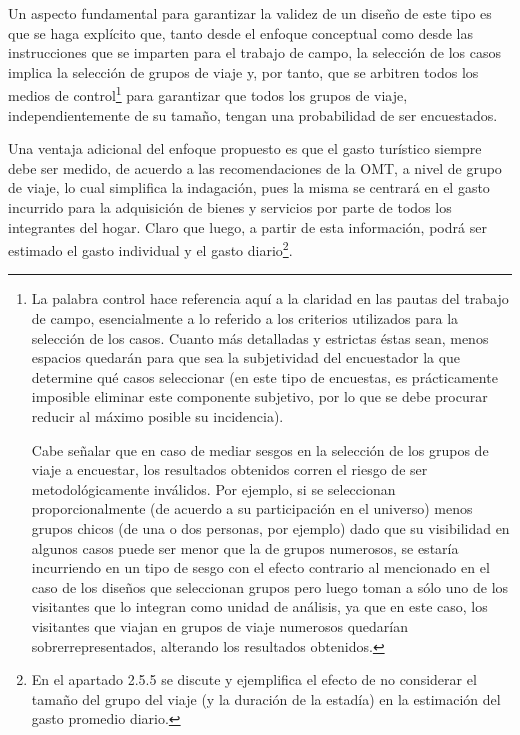 \documentclass[
]{book}
\begin{document}
Un aspecto fundamental para garantizar la validez de un diseño de este tipo es que se haga explícito que, tanto desde el enfoque conceptual como desde las instrucciones que se imparten para el trabajo de campo, la selección de los casos implica la selección de grupos de viaje y, por tanto, que se arbitren todos los medios de control\footnote{La palabra control hace referencia aquí a la claridad en las pautas del trabajo de campo, esencialmente a lo referido a los criterios utilizados para la selección de los casos. Cuanto más detalladas y estrictas éstas sean, menos espacios quedarán para que sea la subjetividad del encuestador la que determine qué casos seleccionar (en este tipo de encuestas, es prácticamente imposible eliminar este componente subjetivo, por lo que se debe procurar reducir al máximo posible su incidencia).

  Cabe señalar que en caso de mediar sesgos en la selección de los grupos de viaje a encuestar, los resultados obtenidos corren el riesgo de ser metodológicamente inválidos. Por ejemplo, si se seleccionan proporcionalmente (de acuerdo a su participación en el universo) menos grupos chicos (de una o dos personas, por ejemplo) dado que su visibilidad en algunos casos puede ser menor que la de grupos numerosos, se estaría incurriendo en un tipo de sesgo con el efecto contrario al mencionado en el caso de los diseños que seleccionan grupos pero luego toman a sólo uno de los visitantes que lo integran como unidad de análisis, ya que en este caso, los visitantes que viajan en grupos de viaje numerosos quedarían sobrerrepresentados, alterando los resultados obtenidos.} para garantizar que todos los grupos de viaje, independientemente de su tamaño, tengan una probabilidad de ser encuestados.

Una ventaja adicional del enfoque propuesto es que el gasto turístico siempre debe ser medido, de acuerdo a las recomendaciones de la OMT, a nivel de grupo de viaje, lo cual simplifica la indagación, pues la misma se centrará en el gasto incurrido para la adquisición de bienes y servicios por parte de todos los integrantes del hogar. Claro que luego, a partir de esta información, podrá ser estimado el gasto individual y el gasto diario\footnote{En el apartado 2.5.5 se discute y ejemplifica el efecto de no considerar el tamaño del grupo del viaje (y la duración de la estadía) en la estimación del gasto promedio diario.}.
\end{document}
